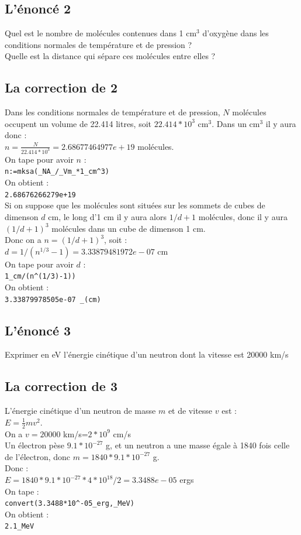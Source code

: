 \documentclass[a4paper,11pt]{book}
\begin{document}
\subsection{L'\'enonc\'e 2}
Quel est le nombre de mol\'ecules contenues dans 1 cm$^3$ d'oxyg\`ene dans les 
conditions normales de temp\'erature et de pression ?\\
Quelle est la distance qui s\'epare ces mol\'ecules entre elles ?

\subsection{La correction de 2}
Dans les conditions normales de temp\'erature et de pression, $N$ mol\'ecules
occupent un volume de 22.414 litres, soit $22.414*10^3$ cm$^3$.
Dans un cm$^3$ il y aura donc :\\
$n=\frac{N}{22.414*10^3}=2.68677464977e+19$ mol\'ecules.\\
On tape pour avoir $n$ :\\
{\tt n:=mksa(\_NA\_/\_Vm\_*1\_cm\verb|^|3)}\\   
On obtient :\\
{\tt 2.68676266279e+19}\\
Si on suppose que les mol\'ecules sont situ\'ees sur les sommets de cubes de 
dimenson $d$ cm, le long d'1 cm il y aura alors $1/d+1$  mol\'ecules, donc 
il y aura $(1/d+1)^3$ mol\'ecules dans un cube de dimenson 1 cm.\\ 
Donc on a $n=(1/d+1)^3$, soit :\\
$d=1/(n^{1/3}-1)=3.33879481972e-07$ cm\\
On tape pour avoir $d$ :\\
{\tt 1\_cm/(n\verb|^|(1/3)-1))}\\   
On obtient :\\
{\tt 3.33879978505e-07 \_(cm)}
\subsection{L'\'enonc\'e 3}
Exprimer en eV l'\'energie cin\'etique d'un neutron dont la vitesse est 
20000 km/s
\subsection{La correction de 3}
L'\'energie cin\'etique d'un neutron de masse $m$ et de vitesse $v$ est :\\
$E=\frac{1}{2}mv^2$.\\
On a $v=20000$ km/s=$2*10^9$ cm/s\\
Un \'electron p\`ese $9.1*10^{-27}$ g, et un neutron a une masse \'egale 
\`a 1840 fois celle de l'\'electron, donc $m=1840*9.1*10^{-27}$ g.\\
Donc :\\
$E=1840*9.1*10^{-27}*4*10^{18}/2=3.3488e-05$ ergs\\
On tape :\\
{\tt convert(3.3488*10\verb|^|-05\_erg,\_MeV)}\\
On obtient :\\
{\tt 2.1\_MeV}
\end{document}
